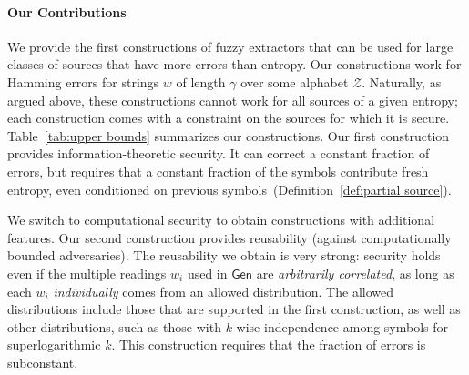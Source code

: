 \documentclass[11pt]{article}
\newcommand{\defref}[1]{\mbox{Definition~\ref{#1}}}
\newcommand{\class}[1]{{\ensuremath{\mathsf{#1}}}}
\newcommand{\gen}{\ensuremath{\class{Gen}}\xspace}
\newcommand{\authnote}[2]{{\textcolor{red}{\textsf{#1 notes: }\textcolor{blue}{ #2}}\marginpar{\textcolor{red}{\textbf{!!!!!}}}}}
\newcommand{\authnote}[2]{}
\newcommand{\lnote}[1]{{\authnote{Leo}{#1}}}
\begin{document}
\paragraph{Our Contributions}
We provide the first constructions of fuzzy extractors that can be used for large classes of sources that have more errors than entropy.  Our constructions work for Hamming errors for strings $w$ of length $\gamma$ over some alphabet $\mathcal{Z}$. Naturally, as argued above, these constructions cannot work for all sources of a given entropy; each construction comes with a constraint on the sources for which it is secure.  Table~\ref{tab:upper bounds} summarizes our constructions.
Our first construction provides information-theoretic security.  It can correct a constant fraction of errors, but requires that a constant fraction of the symbols contribute fresh entropy, even conditioned on previous symbols~(\defref{def:partial source}). %

We switch to computational security to obtain constructions with additional features. Our second construction provides reusability (against computationally bounded adversaries).  
The reusability we obtain is very strong:  security holds even if the multiple readings $w_i$ used in $\gen$ are \emph{arbitrarily correlated}, as long as each $w_i$ \emph{individually} comes from an allowed distribution.
The allowed distributions include those that are supported in the first construction, as well as other distributions, such as those with $k$-wise independence among symbols for superlogarithmic $k$.
This construction requires that the fraction of errors is subconstant. 
\end{document}
